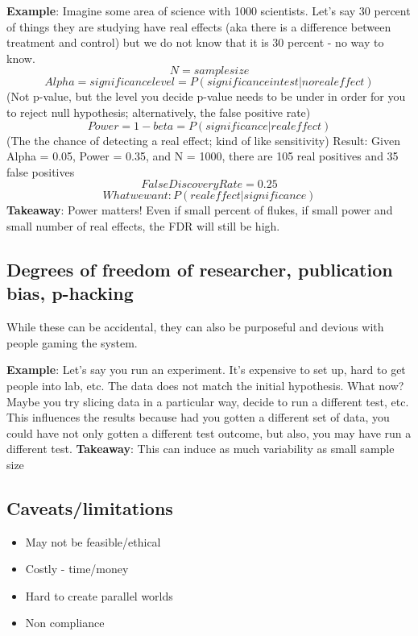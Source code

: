 \textbf{Example}: Imagine some area of science with 1000 scientists. Let's say 30 percent of things they are studying have real effects (aka there is a difference between treatment and control) but we do not know that it is 30 percent - no way to know.
\[N = sample size\]
\[Alpha = significance level = P(significance in test | no real effect)\]
(Not p-value, but the level you decide p-value needs to be under in order for you to reject null hypothesis; alternatively, the false positive rate)
\[Power = 1 - beta = P(significance | real effect)\]
(The the chance of detecting a real effect; kind of like sensitivity)\newline
Result: Given Alpha = 0.05, Power = 0.35,  and N = 1000, there are 105 real positives and 35 false positives
\[False Discovery Rate = 0.25\]
\[What we want: P( real effect | significance)\]
\textbf{Takeaway}: Power matters! Even if small percent of flukes, if small power and small number of real effects, the FDR will still be high.

\subsection{Degrees of freedom of researcher, publication bias, p-hacking}
While these can be accidental, they can also be purposeful and devious with people gaming the system.\newline

\textbf{Example}: Let's say you run an experiment. It's expensive to set up, hard to get people into lab, etc. The data does not match the initial hypothesis. What now? Maybe you try slicing data in a particular way, decide to run a different test, etc. This influences the results because had you gotten a different set of data, you could have not only gotten a different test outcome, but also, you may have run a different test. \newline
\textbf{Takeaway}: This can induce as much variability as small sample size

\subsection{Caveats/limitations}
\begin{itemize}
\item May not be feasible/ethical
\item Costly - time/money
\item Hard to create parallel worlds
\item Non compliance
\end{itemize}


